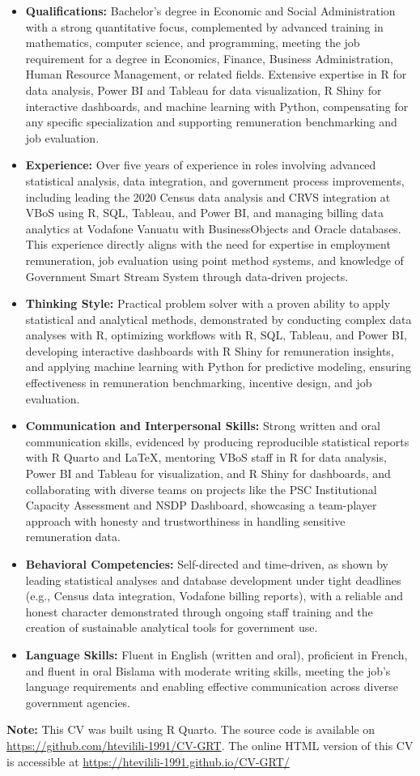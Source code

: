 \documentclass[
  letterpaper,
  DIV=11,
  numbers=noendperiod]{scrartcl}
\providecommand{\tightlist}{%
  \setlength{\itemsep}{0pt}\setlength{\parskip}{0pt}}
\begin{document}
\begin{itemize}
\tightlist
\item
  \textbf{Qualifications:} Bachelor's degree in Economic and Social
  Administration with a strong quantitative focus, complemented by
  advanced training in mathematics, computer science, and programming,
  meeting the job requirement for a degree in Economics, Finance,
  Business Administration, Human Resource Management, or related fields.
  Extensive expertise in R for data analysis, Power BI and Tableau for
  data visualization, R Shiny for interactive dashboards, and machine
  learning with Python, compensating for any specific specialization and
  supporting remuneration benchmarking and job evaluation.
\item
  \textbf{Experience:} Over five years of experience in roles involving
  advanced statistical analysis, data integration, and government
  process improvements, including leading the 2020 Census data analysis
  and CRVS integration at VBoS using R, SQL, Tableau, and Power BI, and
  managing billing data analytics at Vodafone Vanuatu with
  BusinessObjects and Oracle databases. This experience directly aligns
  with the need for expertise in employment remuneration, job evaluation
  using point method systems, and knowledge of Government Smart Stream
  System through data-driven projects.
\item
  \textbf{Thinking Style:} Practical problem solver with a proven
  ability to apply statistical and analytical methods, demonstrated by
  conducting complex data analyses with R, optimizing workflows with R,
  SQL, Tableau, and Power BI, developing interactive dashboards with R
  Shiny for remuneration insights, and applying machine learning with
  Python for predictive modeling, ensuring effectiveness in remuneration
  benchmarking, incentive design, and job evaluation.
\item
  \textbf{Communication and Interpersonal Skills:} Strong written and
  oral communication skills, evidenced by producing reproducible
  statistical reports with R Quarto and LaTeX, mentoring VBoS staff in R
  for data analysis, Power BI and Tableau for visualization, and R Shiny
  for dashboards, and collaborating with diverse teams on projects like
  the PSC Institutional Capacity Assessment and NSDP Dashboard,
  showcasing a team-player approach with honesty and trustworthiness in
  handling sensitive remuneration data.
\item
  \textbf{Behavioral Competencies:} Self-directed and time-driven, as
  shown by leading statistical analyses and database development under
  tight deadlines (e.g., Census data integration, Vodafone billing
  reports), with a reliable and honest character demonstrated through
  ongoing staff training and the creation of sustainable analytical
  tools for government use.
\item
  \textbf{Language Skills:} Fluent in English (written and oral),
  proficient in French, and fluent in oral Bislama with moderate writing
  skills, meeting the job's language requirements and enabling effective
  communication across diverse government agencies.
\end{itemize}

\textbf{Note:} This CV was built using R Quarto. The source code is
available on \url{https://github.com/htevilili-1991/CV-GRT}. The online
HTML version of this CV is accessible at
\url{https://htevilili-1991.github.io/CV-GRT/}
\end{document}
